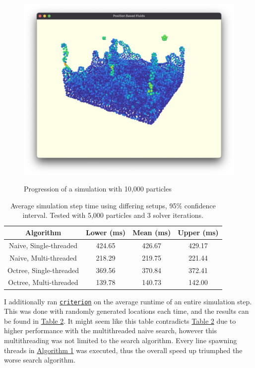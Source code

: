\documentclass[sigplan,screen]{acmart}
\begin{document}
\begin{figure}
  \includegraphics[width=\columnwidth]{images/simulation_end.png} \label{fig:sim_end}
  \caption{Progression of a simulation with 10,000 particles}
\end{figure}

\begin{table}[H]
  \caption{Average simulation step time using differing setups, 95\% confidence interval. Tested with 5,000 particles and 3 solver iterations.}
  \label{tab:sim_runtimes}
  \begin{tabular}{c|ccc}
    \toprule
    Algorithm &Lower (ms) &Mean (ms) &Upper (ms)\\
    \midrule
    Naive, Single-threaded &424.65 &426.67 &429.17\\
    Naive, Multi-threaded &218.29 &219.75 &221.44\\
    Octree, Single-threaded &369.56 &370.84 &372.41\\
    Octree, Multi-threaded &139.78 &140.73 &142.00\\
  \bottomrule
\end{tabular}
\end{table}

I additionally ran \href{https://docs.rs/criterion/latest/criterion/}{\texttt{criterion}} on the average runtime of an entire simulation step. This was done with randomly generated locations each time, and the results can be found in \hyperref[tab:sim_runtimes]{Table 2}. It might seem like this table contradicts \hyperref[tab:sim_runtimes]{Table 2} due to higher performance with the multithreaded naive search, however this multithreading was not limited to the search algorithm. Every line spawning threads in \hyperref[alg:cpu]{Algorithm 1} was executed, thus the overall speed up triumphed the worse search algorithm. 
\end{document}

